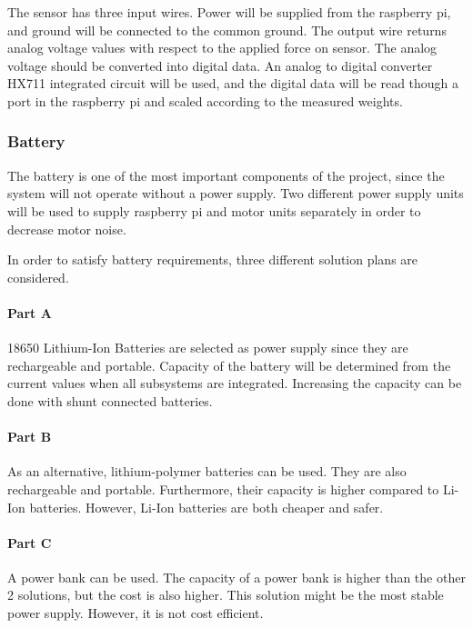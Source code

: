 


  
  The sensor has three input wires. Power will be supplied from the raspberry pi, and ground will be connected to the common ground. The output wire returns analog voltage values with respect to the applied force on sensor. The analog voltage should be converted into digital data. An analog to digital converter HX711 integrated circuit will be used, and the digital data will be read though a port in the raspberry pi and scaled according to the measured weights.\cite{cite:hx711}
    
    \subsubsection{Battery}

The battery is one of the most important components of the project, since the system will not operate without a power supply. Two different power supply units will be used to supply raspberry pi and motor units separately in order to decrease motor noise.

In order to satisfy battery requirements, three different solution plans are considered.

\paragraph{Part A}
 18650 Lithium-Ion Batteries are selected as power supply since they are rechargeable and portable. Capacity of the battery will be determined from the current values when all subsystems are integrated. Increasing the capacity can be done with shunt connected batteries.
 
\paragraph{Part B}
 As an alternative, lithium-polymer batteries can be used. They are also rechargeable and portable. Furthermore, their capacity is higher compared to Li-Ion batteries. However, Li-Ion batteries are both cheaper and safer.
 
 \paragraph{Part C} 
 A power bank can be used. The capacity of a power bank is higher than the other 2 solutions, but the cost is also higher. This solution might be the most stable power supply. However, it is not cost efficient.
 
